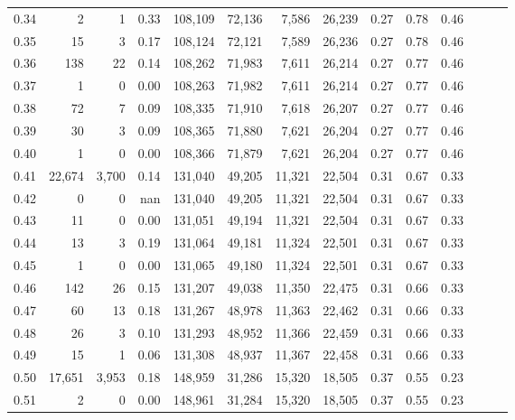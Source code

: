 \begin{tabular}{rrrrrrrrrrrrrr}
0.34 &       2 &      1 &  0.33 &  108,109 &   72,136 &   7,586 &  26,239 &  0.27 &  0.78 &      0.46 \\
0.35 &      15 &      3 &  0.17 &  108,124 &   72,121 &   7,589 &  26,236 &  0.27 &  0.78 &      0.46 \\
0.36 &     138 &     22 &  0.14 &  108,262 &   71,983 &   7,611 &  26,214 &  0.27 &  0.77 &      0.46 \\
0.37 &       1 &      0 &  0.00 &  108,263 &   71,982 &   7,611 &  26,214 &  0.27 &  0.77 &      0.46 \\
0.38 &      72 &      7 &  0.09 &  108,335 &   71,910 &   7,618 &  26,207 &  0.27 &  0.77 &      0.46 \\
0.39 &      30 &      3 &  0.09 &  108,365 &   71,880 &   7,621 &  26,204 &  0.27 &  0.77 &      0.46 \\
0.40 &       1 &      0 &  0.00 &  108,366 &   71,879 &   7,621 &  26,204 &  0.27 &  0.77 &      0.46 \\
0.41 &  22,674 &  3,700 &  0.14 &  131,040 &   49,205 &  11,321 &  22,504 &  0.31 &  0.67 &      0.33 \\
0.42 &       0 &      0 &   nan &  131,040 &   49,205 &  11,321 &  22,504 &  0.31 &  0.67 &      0.33 \\
0.43 &      11 &      0 &  0.00 &  131,051 &   49,194 &  11,321 &  22,504 &  0.31 &  0.67 &      0.33 \\
0.44 &      13 &      3 &  0.19 &  131,064 &   49,181 &  11,324 &  22,501 &  0.31 &  0.67 &      0.33 \\
0.45 &       1 &      0 &  0.00 &  131,065 &   49,180 &  11,324 &  22,501 &  0.31 &  0.67 &      0.33 \\
0.46 &     142 &     26 &  0.15 &  131,207 &   49,038 &  11,350 &  22,475 &  0.31 &  0.66 &      0.33 \\
0.47 &      60 &     13 &  0.18 &  131,267 &   48,978 &  11,363 &  22,462 &  0.31 &  0.66 &      0.33 \\
0.48 &      26 &      3 &  0.10 &  131,293 &   48,952 &  11,366 &  22,459 &  0.31 &  0.66 &      0.33 \\
0.49 &      15 &      1 &  0.06 &  131,308 &   48,937 &  11,367 &  22,458 &  0.31 &  0.66 &      0.33 \\
0.50 &  17,651 &  3,953 &  0.18 &  148,959 &   31,286 &  15,320 &  18,505 &  0.37 &  0.55 &      0.23 \\
0.51 &       2 &      0 &  0.00 &  148,961 &   31,284 &  15,320 &  18,505 &  0.37 &  0.55 &      0.23 \\

\end{tabular}
